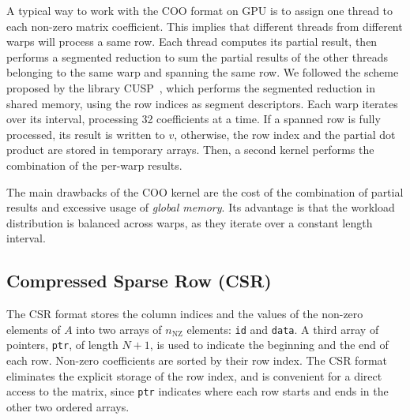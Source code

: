 \documentclass[runningheads,orivec]{llncs}
\begin{document}
A typical way to work with the COO format on GPU is to assign one thread to each non-zero matrix coefficient. This implies that different threads from different warps will process a same row. Each thread computes its partial result, then performs a segmented reduction \cite{BLEL93,SENG07} to sum the partial results of the other threads belonging to the same warp and spanning the same row. We followed the scheme proposed by the library CUSP~\cite{CUSP}, which performs the segmented reduction in shared memory, using the row indices as segment descriptors. Each warp iterates over its interval, processing 32 coefficients at a time. If a spanned row is fully processed, its result is written to $v$, otherwise, the row index and the partial dot product are stored in temporary arrays. Then, a second kernel performs the combination of the per-warp results.

The main drawbacks of the COO kernel are the cost of the combination of partial results and excessive usage of \textit{global memory}. Its advantage is that the workload distribution is balanced across warps, as they iterate over a constant length interval.   

\vspace*{-0.25cm}

\subsection*{Compressed Sparse Row (CSR)} 
\vspace*{-0.25cm}

The CSR format stores the column indices and the values of the non-zero elements of $A$ into two arrays of $n_{\mathrm{NZ}}$ elements: \texttt{id} and \texttt{data}. A third array of pointers, \texttt{ptr}, of length $N+1$, is used to indicate the beginning and the end of each row. Non-zero coefficients are sorted by their row index. The CSR format eliminates the explicit storage of the row index, and is convenient for a direct access to the matrix, since \texttt{ptr} indicates where each row starts and ends in the other two ordered arrays.
\end{document}
